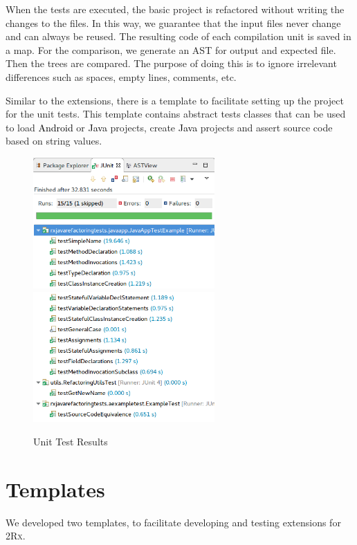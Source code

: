 \documentclass[type=bsc,accentcolor=tud9c]{tudthesis}
\newcommand{\framework}[1]{\textcolor{black}{#1}}
\newcommand{\toolcore}{\textsc{2Rx}}
\begin{document}
When the tests are executed, the basic project is refactored without writing the changes to the files. In this way, we guarantee that the input files never change and can always be reused. The resulting code of each compilation unit is saved in a map. For the comparison, we generate an AST for output and expected file. Then the trees are compared. The purpose of doing this is to ignore irrelevant differences such as spaces, empty lines, comments, etc.

Similar to the extensions, there is a template to facilitate setting up the project for the unit tests. This template contains abstract tests classes that can be used to load \framework{Android} or \framework{Java} projects, create \framework{Java} projects and assert source code based on string values.

\begin{figure}[H]
\begin{center}
\includegraphics[height=5cm]{unit-tests/unit-tests-results1.png}
\includegraphics[height=5cm]{unit-tests/unit-tests-results2.png}
\end{center}
\caption{Unit Test Results}
\label{fig:unit-test-results}
\end{figure}

\section{Templates}
We developed two templates, to facilitate developing and testing extensions for \toolcore{}.
\end{document}
